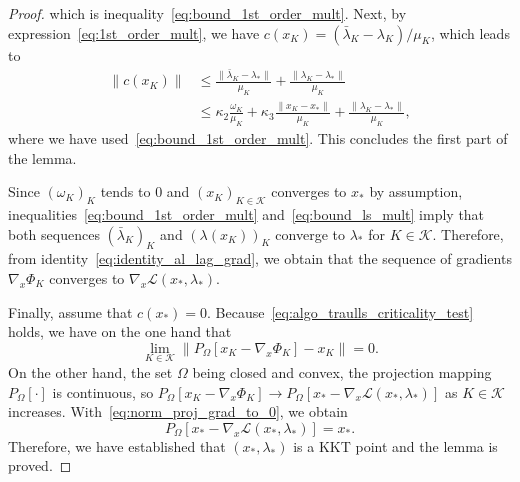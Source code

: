 \documentclass{article}
\numberwithin{equation}{section}
\newcommand{\calL}{{\mathcal{L}}}
\newcommand{\calK}{{\mathcal{K}}}
\newcommand{\proj}[2]{P_{#1} \left[ {#2} \right]} %
\theoremstyle{plain}
\begin{document}
\begin{proof}
		which is inequality~\eqref{eq:bound_1st_order_mult}. 
		Next, by expression~\eqref{eq:1st_order_mult}, we have $c(x_K) = (\bar \lambda_K - \lambda_K) / \mu_K$, which leads to
		\begin{equation*}
			\begin{split}
				\|c(x_K) \| & \le \frac{\|\bar \lambda_K - \lambda_* \|}{\mu_K} + \frac{\|\lambda_K - \lambda_* \|}{\mu_K} \\
				& \le \kappa_2 \frac{\omega_K}{\mu_K} + \kappa_3 \frac{\|x_K-x_*\|}{\mu_K} + \frac{\|\lambda_K - \lambda_* \|}{\mu_K},
			\end{split}
		\end{equation*}
		where we have used~\eqref{eq:bound_1st_order_mult}.
		This concludes the first part of the lemma. 
		
		Since $(\omega_K)_K$ tends to $0$ and $(x_K)_{K\in \calK}$ converges to $x_*$ by assumption, inequalities~\eqref{eq:bound_1st_order_mult} and~\eqref{eq:bound_ls_mult} imply that both sequences $(\bar \lambda_K)_K$ and $(\lambda(x_K))_K$ converge to $\lambda_*$ for $K \in \calK$. Therefore, from identity~\eqref{eq:identity_al_lag_grad}, we obtain that the sequence of gradients $\nabla_x \Phi_K$ converges to $\nabla_x \calL(x_*,\lambda_*)$. 
		
		Finally, assume that $c(x_*) = 0$. Because~\eqref{eq:algo_traulls_criticality_test} holds, we have on the one hand that 
		\begin{equation}\label{eq:norm_proj_grad_to_0}
			\lim\limits_{K \in \calK} \|\proj{\Omega}{x_K-\nabla_x \Phi_K} - x_K\|= 0.
		\end{equation}
		On the other hand, the set $\Omega$ being closed and convex, the projection mapping $\proj{\Omega}{\cdot}$ is continuous, so $\proj{\Omega}{x_K-\nabla_x \Phi_K} \to \proj{\Omega}{x_*-\nabla_x \calL(x_*,\lambda_*)}$ as $K \in \calK$ increases. With~\eqref{eq:norm_proj_grad_to_0}, we obtain
		\[\proj{\Omega}{x_*-\nabla_x \calL(x_*,\lambda_*)} = x_*.\]
		Therefore, we have established that $(x_*,\lambda_*)$ is a KKT point and the lemma is proved.
	\end{proof}
	
\end{document}
